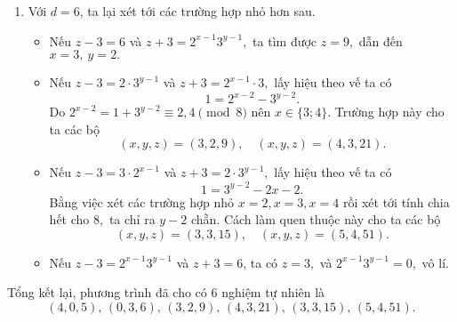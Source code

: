 \begin{gbtt}
{\begin{enumerate}
\begin{itemize}
          \item{} Nếu $z-3=3\cdot 2^x$ và $z+3=3^{y-1},$ lấy hiệu theo vế ta có
          $$3\cdot2^x+6=3^{y-1}.$$
          Nếu $x\ge 1,$ vế trái là số chẵn nên $3^{y-1}$ chẵn, vô lí. Như vậy $x=0,$ và $y=3,\ z=6.$
          \item{} Nếu $z-3=3^{y-1}$ và $z+3=3\cdot 2^x,$ lấy hiệu theo vế ta có
          $$3^{y-1}+6=3\cdot 2^x.$$
          Xét tính chẵn lẻ ở hai vế, ta thấy $2^x$ lẻ nên $x=0,$ nhưng khi đó $3^{y-1}=-3,$ vô lí.
          \item{} Nếu $z-3=2^x3^{y-1}$ và $z+3=3$, ta có $z=0$ và $2^x3^{y-1}=-3,$ vô lí.
     \end{itemize}
    \item Với $d=6$, ta lại xét tới các trường hợp nhỏ hơn sau.
    \begin{itemize}
        \item{} Nếu $z-3=6$ và $z+3=2^{x-1}3^{y-1},$ ta tìm được $z=9,$ dẫn đến $x=3,\ y=2.$
        \item{} Nếu $z-3=2\cdot 3^{y-1}$ và $z+3=2^{x-1}\cdot 3,$ lấy hiệu theo vế ta có
        $$1=2^{x-2}-3^{y-2}.$$ 
        Do $2^{x-2}=1+3^{y-2}\equiv 2,4\pmod{8}$ nên $x\in \{3;4\}.$ Trường hợp này cho ta các bộ 
        $$(x,y,z)=(3,2,9),\quad (x,y,z)=(4,3,21).$$
        \item{} Nếu $z-3=3\cdot 2^{x-1}$ và $z+3=2\cdot 3^{y-1},$ lấy hiệu theo vế ta có 
        $$1=3^{y-2}-2{x-2}.$$ 
        Bằng việc xét các trường hợp nhỏ $x=2,x=3,x=4$ rồi xét tới tính chia hết cho $8,$ ta chỉ ra $y-2$ chẵn. Cách làm quen thuộc này cho ta các bộ
        $$(x,y,z)=(3,3,15),\quad (x,y,z)=(5,4,51).$$
         \item{} Nếu $z-3=2^{x-1}3^{y-1}$ và $z+3=6$, ta có $z=3,$ và $2^{x-1}3^{y-1}=0,$ vô lí.
     \end{itemize}
\end{enumerate}
Tổng kết lại, phương trình đã cho có $6$ nghiệm tự nhiên là
\[(4,0,5),\, (0,3,6),\, (3,2,9),\, (4,3,21),\, (3,3,15),\, (5,4,51).\]}
\end{gbtt}

